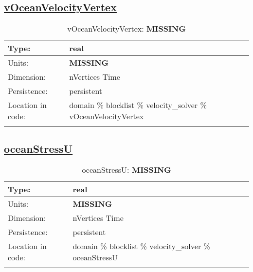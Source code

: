 \subsection[vOceanVelocityVertex]{\hyperref[sec:var_tab_velocity_solver]{vOceanVelocityVertex}}
\label{subsec:var_sec_velocity_solver_vOceanVelocityVertex}
\begin{center}
\begin{longtable}{| p{2.0in} | p{4.0in} |}
        \hline 
        Type: & real \\
        \hline 
        Units: & {\bf \color{red} MISSING} \\
        \hline 
        Dimension: & nVertices Time \\
        \hline 
        Persistence: & persistent \\
        \hline 
         Location in code: & domain \% blocklist \% velocity\_solver \% vOceanVelocityVertex \\
         \hline 
    \caption{vOceanVelocityVertex: {\bf \color{red} MISSING}}
\end{longtable}
\end{center}
\subsection[oceanStressU]{\hyperref[sec:var_tab_velocity_solver]{oceanStressU}}
\label{subsec:var_sec_velocity_solver_oceanStressU}
\begin{center}
\begin{longtable}{| p{2.0in} | p{4.0in} |}
        \hline 
        Type: & real \\
        \hline 
        Units: & {\bf \color{red} MISSING} \\
        \hline 
        Dimension: & nVertices Time \\
        \hline 
        Persistence: & persistent \\
        \hline 
         Location in code: & domain \% blocklist \% velocity\_solver \% oceanStressU \\
         \hline 
    \caption{oceanStressU: {\bf \color{red} MISSING}}
\end{longtable}
\end{center}
